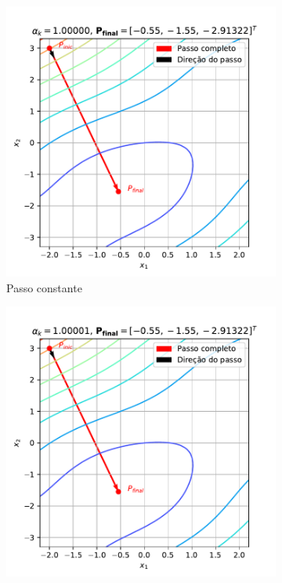\documentclass[10pt, a4paper]{article}
\begin{document}
\begin{figure}
  \centering
  \begin{subfigure}[b]{0.32\textwidth}
      \centering
      \includegraphics[width=\textwidth]{images/q2b_1.pdf}
      \caption{Passo constante}
      \label{fig:q2b_1}
  \end{subfigure}
  \hfill
  \begin{subfigure}[b]{0.32\textwidth}
      \centering
      \includegraphics[width=\textwidth]{images/q2b_2.pdf}

\end{subfigure}
\end{figure}
\end{document}
